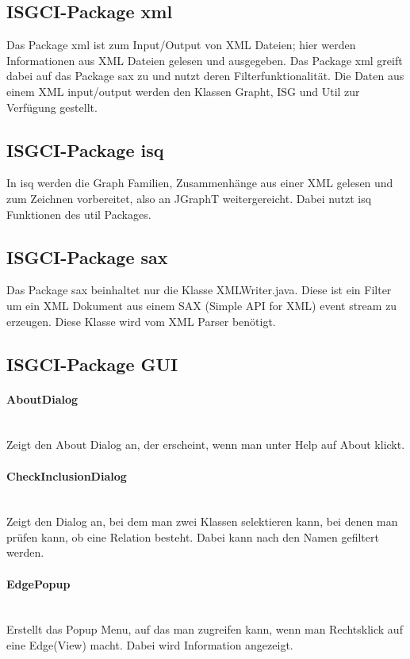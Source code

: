 \documentclass[10pt,a4paper]{article}
\begin{document}
\subsection{ISGCI-Package xml}
Das Package xml ist zum Input/Output von XML Dateien; hier werden Informationen aus XML Dateien gelesen und ausgegeben. Das Package xml greift dabei auf das Package sax zu und nutzt deren Filterfunktionalität. Die Daten aus einem XML input/output werden den Klassen Grapht, ISG und Util zur Verfügung gestellt. \\

\subsection{ISGCI-Package isq}
In isq werden die Graph Familien, Zusammenhänge aus einer XML gelesen und zum Zeichnen vorbereitet, also an JGraphT weitergereicht. Dabei nutzt isq Funktionen des util Packages. 

\subsection{ISGCI-Package sax}
Das Package sax beinhaltet nur die Klasse XMLWriter.java. Diese ist ein Filter um ein XML Dokument aus einem SAX (Simple API for XML) event stream zu erzeugen. Diese Klasse wird vom XML Parser benötigt.

\subsection{ISGCI-Package GUI}

\paragraph{AboutDialog}\ \\Zeigt den About Dialog an, der erscheint, wenn man unter Help auf About klickt.

\paragraph{CheckInclusionDialog}\ \\Zeigt den Dialog an, bei dem man zwei Klassen selektieren kann, bei denen man prüfen kann, ob eine Relation besteht. Dabei kann nach den Namen gefiltert werden.

\paragraph{EdgePopup}\ \\Erstellt das Popup Menu, auf das man zugreifen kann, wenn man Rechtsklick auf eine Edge(View) macht. Dabei wird Information angezeigt.
\end{document}
